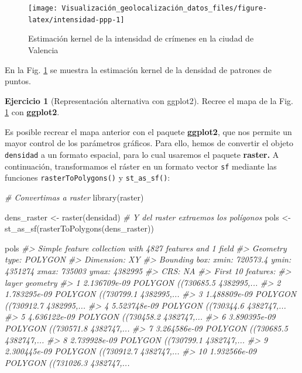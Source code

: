 \documentclass[
]{book}
\newenvironment{Shaded}{\begin{snugshade}}{\end{snugshade}}
\newcommand{\CommentTok}[1]{\textcolor[rgb]{0.56,0.35,0.01}{\textit{#1}}}
\newcommand{\FunctionTok}[1]{\textcolor[rgb]{0.00,0.00,0.00}{#1}}
\newcommand{\NormalTok}[1]{#1}
\newcommand{\OtherTok}[1]{\textcolor[rgb]{0.56,0.35,0.01}{#1}}
\theoremstyle{definition}
\theoremstyle{definition}
\theoremstyle{definition}
\newtheorem{exercise}{Ejercicio}[chapter]
\theoremstyle{definition}
\theoremstyle{remark}
\begin{document}
\begin{figure}

{\centering \texttt{[image: Visualización\_geolocalización\_datos\_files/figure-latex/intensidad-ppp-1]} 

}

\caption{Estimación kernel de la intensidad de crímenes en la ciudad de Valencia}\label{fig:intensidad-ppp}
\end{figure}

En la Fig. \ref{fig:intensidad-ppp} se muestra la estimación kernel de la
densidad de patrones de puntos.

\begin{exercise}[Representación alternativa con ggplot2]
Recree el mapa de la Fig. \ref{fig:intensidad-ppp} con \textbf{ggplot2}.
\end{exercise}

Es posible recrear el mapa anterior con el paquete \textbf{ggplot2}, que nos permite
un mayor control de los parámetros gráficos. Para ello, hemos de convertir el
objeto \texttt{densidad} a un formato espacial, para lo cual usaremos el paquete
\textbf{raster.} A continuación, transformamos el ráster en un formato vector \texttt{sf}
mediante las funciones \texttt{rasterToPolygons()} y \texttt{st\_as\_sf()}:

\begin{Shaded}
\begin{Highlighting}[]
\CommentTok{\# Convertimas a raster}
\FunctionTok{library}\NormalTok{(raster)}

\NormalTok{dens\_raster }\OtherTok{\textless{}{-}} \FunctionTok{raster}\NormalTok{(densidad)}
\CommentTok{\# Y del raster extraemos los polígonos}
\NormalTok{pols }\OtherTok{\textless{}{-}} \FunctionTok{st\_as\_sf}\NormalTok{(}\FunctionTok{rasterToPolygons}\NormalTok{(dens\_raster))}

\NormalTok{pols}
\CommentTok{\#\textgreater{} Simple feature collection with 4827 features and 1 field}
\CommentTok{\#\textgreater{} Geometry type: POLYGON}
\CommentTok{\#\textgreater{} Dimension:     XY}
\CommentTok{\#\textgreater{} Bounding box:  xmin: 720573.4 ymin: 4351274 xmax: 735003 ymax: 4382995}
\CommentTok{\#\textgreater{} CRS:           NA}
\CommentTok{\#\textgreater{} First 10 features:}
\CommentTok{\#\textgreater{}           layer                       geometry}
\CommentTok{\#\textgreater{} 1  2.136709e{-}09 POLYGON ((730685.5 4382995,...}
\CommentTok{\#\textgreater{} 2  1.783295e{-}09 POLYGON ((730799.1 4382995,...}
\CommentTok{\#\textgreater{} 3  1.488809e{-}09 POLYGON ((730912.7 4382995,...}
\CommentTok{\#\textgreater{} 4  5.523748e{-}09 POLYGON ((730344.6 4382747,...}
\CommentTok{\#\textgreater{} 5  4.636122e{-}09 POLYGON ((730458.2 4382747,...}
\CommentTok{\#\textgreater{} 6  3.890395e{-}09 POLYGON ((730571.8 4382747,...}
\CommentTok{\#\textgreater{} 7  3.264586e{-}09 POLYGON ((730685.5 4382747,...}
\CommentTok{\#\textgreater{} 8  2.739928e{-}09 POLYGON ((730799.1 4382747,...}
\CommentTok{\#\textgreater{} 9  2.300445e{-}09 POLYGON ((730912.7 4382747,...}
\CommentTok{\#\textgreater{} 10 1.932566e{-}09 POLYGON ((731026.3 4382747,...}
\end{Highlighting}
\end{Shaded}
\end{document}

